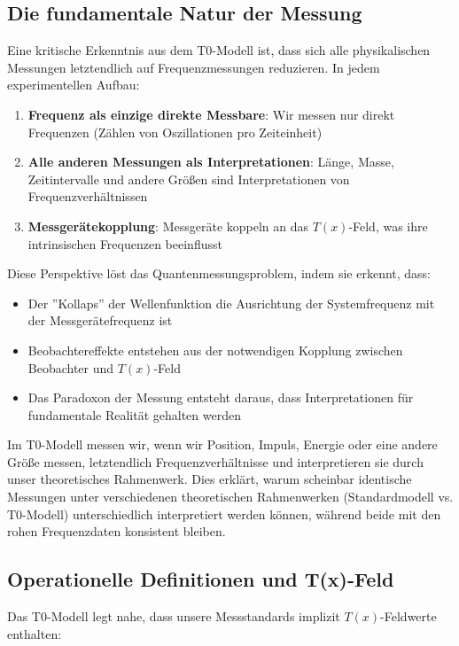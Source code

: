 \documentclass[12pt,a4paper]{article}
\newcommand{\Tfield}{T(x)}
\begin{document}
	\subsection{Die fundamentale Natur der Messung}
	
	Eine kritische Erkenntnis aus dem T0-Modell ist, dass sich alle physikalischen Messungen letztendlich auf Frequenzmessungen reduzieren. In jedem experimentellen Aufbau:
	
	\begin{enumerate}
		\item \textbf{Frequenz als einzige direkte Messbare}: Wir messen nur direkt Frequenzen (Zählen von Oszillationen pro Zeiteinheit)
		\item \textbf{Alle anderen Messungen als Interpretationen}: Länge, Masse, Zeitintervalle und andere Größen sind Interpretationen von Frequenzverhältnissen
		\item \textbf{Messgerätekopplung}: Messgeräte koppeln an das $\Tfield$-Feld, was ihre intrinsischen Frequenzen beeinflusst
	\end{enumerate}
	
	Diese Perspektive löst das Quantenmessungsproblem, indem sie erkennt, dass:
	
	\begin{itemize}
		\item Der ''Kollaps'' der Wellenfunktion die Ausrichtung der Systemfrequenz mit der Messgerätefrequenz ist
		\item Beobachtereffekte entstehen aus der notwendigen Kopplung zwischen Beobachter und $\Tfield$-Feld
		\item Das Paradoxon der Messung entsteht daraus, dass Interpretationen für fundamentale Realität gehalten werden
	\end{itemize}
	
	Im T0-Modell messen wir, wenn wir Position, Impuls, Energie oder eine andere Größe messen, letztendlich Frequenzverhältnisse und interpretieren sie durch unser theoretisches Rahmenwerk. Dies erklärt, warum scheinbar identische Messungen unter verschiedenen theoretischen Rahmenwerken (Standardmodell vs. T0-Modell) unterschiedlich interpretiert werden können, während beide mit den rohen Frequenzdaten konsistent bleiben.
	
	\subsection{Operationelle Definitionen und T(x)-Feld}
	
	Das T0-Modell legt nahe, dass unsere Messstandards implizit $\Tfield$-Feldwerte enthalten:
	
\end{document}
